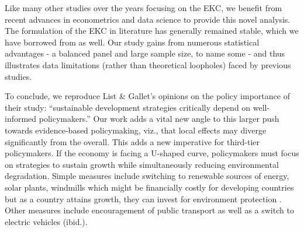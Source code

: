 \documentclass[a4paper,12pt]{article}
\begin{document}
Like many other studies over the years focusing on the EKC, we benefit from recent advances in econometrics and data science to provide this novel analysis. The formulation of the EKC in literature has generally remained stable, which we have borrowed from as well. Our study gains from numerous statistical advantages - a balanced panel and large sample size, to name some - and thus illustrates data limitations (rather than theoretical loopholes) faced by previous studies.

To conclude, we reproduce List \& Gallet’s \parencite*{list1999} opinions on the policy importance of their study: “sustainable development strategies critically depend on well-informed policymakers.” Our work adds a vital new angle to this larger push towards evidence-based policymaking, viz., that local effects may diverge significantly from the overall. This adds a new imperative for third-tier policymakers. If the economy is facing a U-shaped curve, policymakers must focus on strategies to sustain growth while simultaneously reducing environmental degradation. Simple measures include switching to renewable sources of energy, solar plants, windmills which might be financially costly for developing countries but as a country attains growth, they can invest for environment protection \parencite{unep2023}. Other measures include encouragement of public transport as well as a switch to electric vehicles (ibid.).


\printbibliography
\end{document}
